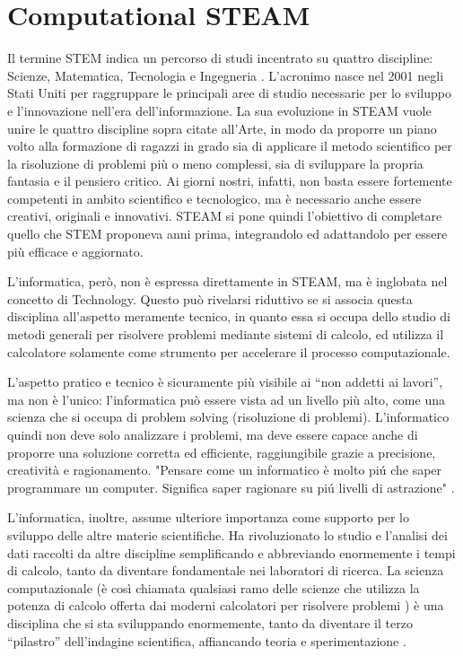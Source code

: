 \chapter{Computational STEAM}
\label{chap:steam}
Il termine STEM indica un percorso di studi incentrato su quattro discipline: Scienze, Matematica, Tecnologia e Ingegneria \cite{stem}. L’acronimo nasce nel 2001 negli Stati Uniti per raggruppare le principali aree di studio necessarie per lo sviluppo e l’innovazione nell’era dell’informazione. La sua evoluzione in STEAM vuole unire le quattro discipline sopra citate all’Arte, in modo da proporre un piano volto alla formazione di ragazzi in grado sia di applicare il metodo scientifico per la risoluzione di problemi più o meno complessi, sia di sviluppare la propria fantasia e il pensiero critico. Ai giorni nostri, infatti, non basta essere fortemente competenti in ambito scientifico e tecnologico, ma è necessario anche essere creativi, originali e innovativi. STEAM si pone quindi l’obiettivo di completare quello che STEM proponeva anni prima, integrandolo ed adattandolo per essere più efficace e aggiornato. 

L’informatica, però, non è espressa direttamente in STEAM, ma è inglobata nel concetto di Technology. Questo può rivelarsi riduttivo se si associa questa disciplina all’aspetto meramente tecnico, in quanto essa si occupa dello studio di metodi generali per risolvere problemi mediante sistemi di calcolo, ed utilizza il calcolatore solamente come strumento \cite{informatica} per accelerare il processo computazionale.

L’aspetto pratico e tecnico è sicuramente più visibile ai “non addetti ai lavori”, ma non è l’unico: l’informatica può essere vista ad un livello più alto, come una scienza che si occupa di problem solving (risoluzione di problemi). L’informatico quindi non deve solo analizzare i problemi, ma deve essere capace anche di proporre una soluzione corretta ed efficiente, raggiungibile grazie a precisione, creatività e ragionamento. "Pensare come un informatico è molto piú che saper programmare un computer. Significa saper ragionare su piú livelli di astrazione" \cite{wing}.

L’informatica, inoltre, assume ulteriore importanza come supporto per lo sviluppo delle altre materie scientifiche. Ha rivoluzionato lo studio e l’analisi dei dati raccolti da altre discipline semplificando e abbreviando enormemente i tempi di calcolo, tanto da diventare fondamentale nei laboratori di ricerca. La scienza computazionale (è così chiamata qualsiasi ramo delle scienze che utilizza la potenza di calcolo offerta dai moderni calcolatori per risolvere problemi \cite{computational_science}) è una disciplina che si sta sviluppando enormemente, tanto da diventare il terzo “pilastro” dell’indagine scientifica, affiancando teoria e sperimentazione \cite{ensuring_america_competitivness}.

